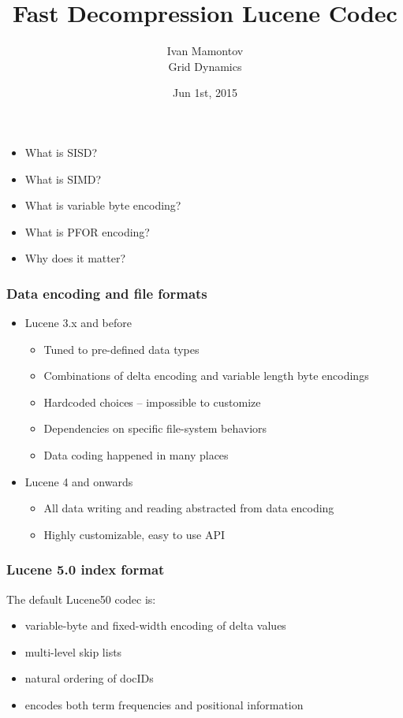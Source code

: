\documentclass{beamer}
\title{Fast Decompression Lucene Codec}
\author{Ivan Mamontov\\ Grid Dynamics}
\institute{Berlin Buzzwords}
\date{Jun 1st, 2015}
\begin{document}
	\begin{frame}
		\titlepage
	\end{frame}
	\begin{frame}
    		\begin{itemize}
    		    \item What is SISD?
  			\item What is SIMD?
  			\item What is variable byte encoding?
  			\item What is PFOR encoding?
  			\item Why does it matter?
		\end{itemize}
  	\end{frame}
  	\begin{frame}
  		\frametitle{Data encoding and file formats}
  		\begin{itemize}
  			\item Lucene 3.x and before
  			\begin{itemize}
  				\item Tuned to pre-defined data types
  				\item Combinations of delta encoding and variable length byte encodings
  				\item Hardcoded choices -- impossible to customize
  				\item Dependencies on specific file-system behaviors
  				\item Data coding happened in many places
  			\end{itemize}
	  			\item Lucene 4 and onwards
  					\begin{itemize}
  						\item All data writing and reading abstracted from data encoding
  						\item Highly customizable, easy to use API
  					\end{itemize}		
  		\end{itemize}
  	\end{frame}
  	\begin{frame}
  		\frametitle{Lucene 5.0 index format}
  		The default Lucene50 codec is:
  		\begin{itemize}
  			\item variable-byte and fixed-width encoding of delta values
  			\item multi-level skip lists
  			\item natural ordering of docIDs
  			\item encodes both term frequencies and positional information
  		\end{itemize}
  	\end{frame}
\end{document}
